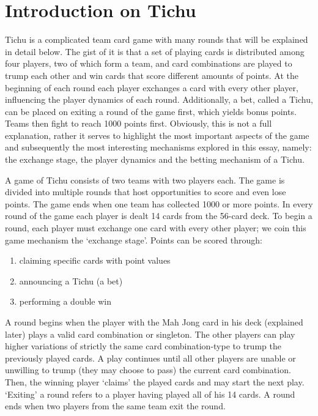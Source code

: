 \section{Introduction on Tichu}

Tichu is a complicated team card game with many rounds that will be explained in detail below. The gist of it is that a set of playing cards is distributed among four players, two of which form a team, and card combinations are played to trump each other and win cards that score different amounts of points. At the beginning of each round each player exchanges a card with every other player, influencing the player dynamics of each round. Additionally, a bet, called a Tichu, can be placed on exiting a round of the game first, which yields bonus points. Teams then fight to reach 1000 points first. Obviously, this is not a full explanation, rather it serves to highlight the most important aspects of the game and subsequently the most interesting mechanisms explored in this essay, namely: the exchange stage, the player dynamics and the betting mechanism of a Tichu. 

A game of Tichu consists of two teams with two players each. The game is divided into multiple rounds that host opportunities to score and even lose points. The game ends when one team has collected 1000 or more points. In every round of the game each player is dealt 14 cards from the 56-card deck. To begin a round, each player must exchange one card with every other player; we coin this game mechanism the ‘exchange stage’. Points can be scored through:\\
\begin{enumerate}
\item claiming specific cards with point values
\item announcing a Tichu (a bet)
\item performing a double win
\end{enumerate}

A round begins when the player with the Mah Jong card in his deck (explained later) plays a valid card combination or singleton. The other players can play higher variations of strictly the same card combination-type to trump the previously played cards. A play continues until all other players are unable or unwilling to trump (they may choose to pass) the current card combination. Then, the winning player ‘claims’ the played cards and may start the next play. ‘Exiting’ a round refers to a player having played all of his 14 cards. A round ends when two players from the same team exit the round.



